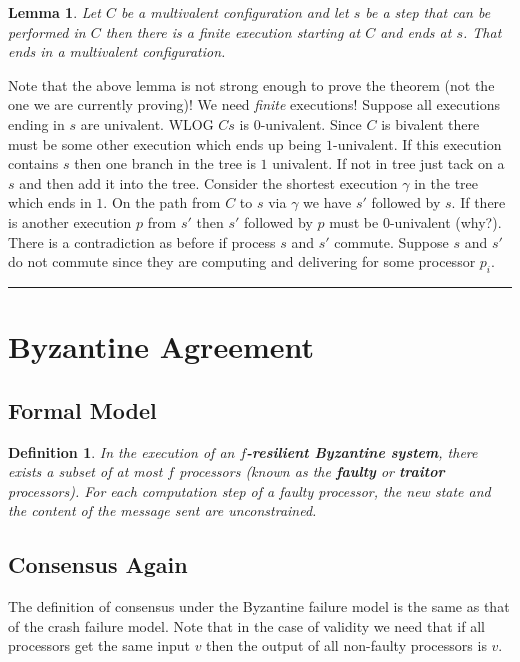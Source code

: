 \documentclass[twoside]{article}
\newtheorem{lemma}[theorem]{Lemma}
\newtheorem{definition}[theorem]{Definition}
\newenvironment{proof}{{\bf Proof:}}{\hfill\rule{2mm}{2mm}}
\begin{document}
\begin{lemma}
\label{lem:noCritMod}
Let $C$ be a multivalent configuration and let $s$ be a step that can be performed in $C$ then there is a finite execution starting at $C$ and ends at $s$. That ends in a multivalent configuration.
\end{lemma}
\begin{proof}
Note that the above lemma is not strong enough to prove the theorem (not the one we are currently proving)! We need \emph{finite} executions! Suppose all executions ending in $s$ are univalent. WLOG $Cs$ is $0$-univalent. Since $C$ is bivalent there must be some other execution which ends up being $1$-univalent. If this execution contains $s$ then one branch in the tree is $1$ univalent. If not in tree just tack on a $s$ and then add it into the tree. Consider the shortest execution $\gamma$ in the tree which ends in $1$. On the path from $C$ to $s$ via $\gamma$ we have $s'$ followed by $s$. If there is another execution $p$ from $s'$ then $s'$ followed by $p$ must be $0$-univalent (why?). There is a contradiction as before if process $s$ and $s'$ commute. Suppose $s$ and $s'$ do not commute since they are computing and delivering for some processor $p_i$.   
\end{proof}

\section{Byzantine Agreement}
\subsection{Formal Model}
\begin{definition}
In the execution of an \textbf{$f$-resilient Byzantine system}, there exists a subset of at most $f$ processors (known as the \textbf{faulty} or \textbf{traitor} processors). For each computation step of a faulty processor, the new state and the content of the message sent are unconstrained.
\end{definition}

\subsection{Consensus Again}
The definition of consensus under the Byzantine failure model is the same as that of the crash failure model. Note that in the case of validity we need that if all processors get the same input $v$ then the output of all non-faulty processors is $v$. 
\end{document}
